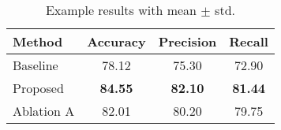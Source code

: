 \begin{table}[t]
  \centering
  \caption{Example results with mean $\pm$ std.}
  \label{tab:results}
  \begin{tabular}{l S[table-format=2.2] S[table-format=2.2] S[table-format=2.2]}
    \toprule
    {Method} & {Accuracy} & {Precision} & {Recall} \\
    \midrule
    Baseline    & 78.12 & 75.30 & 72.90 \\
    Proposed    & \bfseries 84.55 & \bfseries 82.10 & \bfseries 81.44 \\
    Ablation A  & 82.01 & 80.20 & 79.75 \\
    \bottomrule
  \end{tabular}
\end{table}
